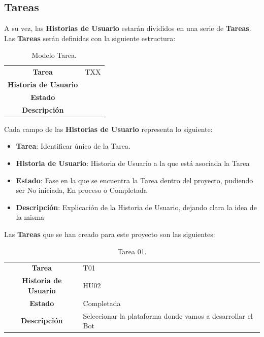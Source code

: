 \newpage
\subsection{Tareas}

A su vez, las \textbf{Historias de Usuario} estarán divididos en una serie de \textbf{Tareas}. Las \textbf{Tareas} serán definidas con la siguiente estructura:

\begin{table}[H]
	\begin{center}
		\begin{tabular}{| c | p{9cm} |}
			\hline
			
			\textbf{Tarea} & TXX \\
			\textbf{Historia de Usuario} &  \\
			\textbf{Estado} &  \\
			\textbf{Descripción} &  \\ \hline
		\end{tabular}
		\caption{Modelo Tarea.}
	\end{center}
\end{table}

Cada campo de las \textbf{Historias de Usuario} representa lo siguiente:

\begin{itemize}
	\item \textbf{Tarea}: Identificar único de la Tarea.
	\item \textbf{Historia de Usuario}: Historia de Usuario a la que está asociada la Tarea
	\item \textbf{Estado}: Fase en la que se encuentra la Tarea dentro del proyecto, pudiendo ser No iniciada, En proceso o Completada
	\item \textbf{Descripción}: Explicación de la Historia de Usuario, dejando clara la idea de la misma
\end{itemize}

Las \textbf{Tareas} que se han creado para este proyecto son las siguientes:

\begin{table}[H]
	\begin{center}
		\begin{tabular}{| c | p{9cm} |}
			\hline
			
			\textbf{Tarea} & T01 \\
			\textbf{Historia de Usuario} & HU02 \\
			\textbf{Estado} & Completada \\
			\textbf{Descripción} & Seleccionar la plataforma donde vamos a desarrollar el Bot \\ \hline
		\end{tabular}
		\caption{Tarea 01.}
	\end{center}
\end{table}

